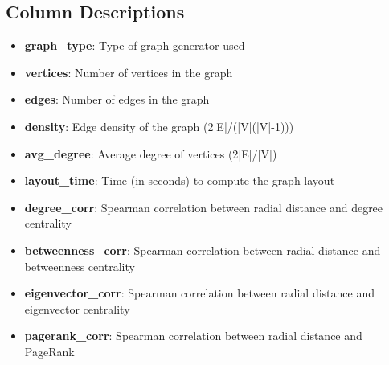 \documentclass{article}
\begin{document}
\subsection*{Column Descriptions}
\begin{itemize}
\item \textbf{graph\_type}: Type of graph generator used
\item \textbf{vertices}: Number of vertices in the graph
\item \textbf{edges}: Number of edges in the graph
\item \textbf{density}: Edge density of the graph (2|E|/(|V|(|V|-1)))
\item \textbf{avg\_degree}: Average degree of vertices (2|E|/|V|)
\item \textbf{layout\_time}: Time (in seconds) to compute the graph layout
\item \textbf{degree\_corr}: Spearman correlation between radial distance and degree centrality
\item \textbf{betweenness\_corr}: Spearman correlation between radial distance and betweenness centrality
\item \textbf{eigenvector\_corr}: Spearman correlation between radial distance and eigenvector centrality
\item \textbf{pagerank\_corr}: Spearman correlation between radial distance and PageRank
\end{itemize}
\end{document}
